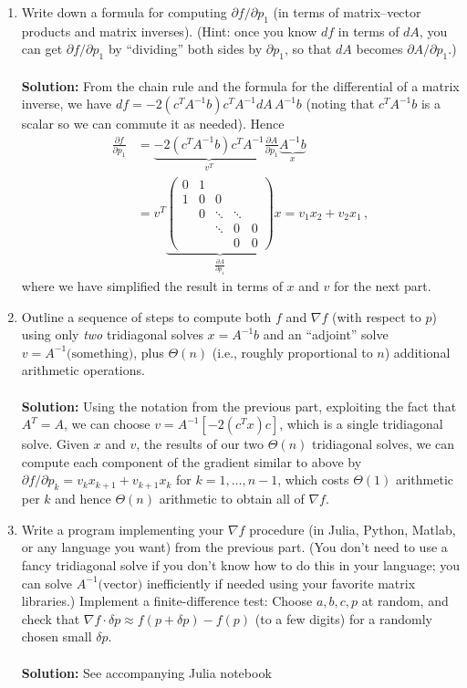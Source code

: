 \documentclass{article}
\begin{document}
\begin{enumerate}
\item Write down a formula for computing $\partial f/\partial p_{1}$ (in
terms of matrix--vector products and matrix inverses). (Hint: once
you know $df$ in terms of $dA$, you can get $\partial f/\partial p_{1}$
by ``dividing'' both sides by $\partial p_{1}$, so that $dA$ becomes
$\partial A/\partial p_{1}$.)
\\
\\
\textbf{Solution:} From the chain rule and the formula for the differential of a matrix inverse, we have $df = -2(c^T A^{-1} b) c^T A^{-1} dA\,A^{-1} b$ (noting that $c^T A^{-1} b$ is a scalar so we can commute it as needed).  Hence
\begin{align*}
\frac{\partial f}{\partial p_1} &= \underbrace{-2(c^T A^{-1} b) c^T A^{-1}}_{v^T} \frac{\partial A}{\partial p_1} \underbrace{A^{-1} b}_x \\
&=  v^T \underbrace{\left(\begin{array}{ccccc}
0 & 1\\
1 & 0 & 0\\
 & 0 & \ddots & \ddots\\
 &  & \ddots & 0 & 0\\
 &  &  & 0 & 0
\end{array}\right)}_{\frac{\partial A}{\partial p_1}} x = \boxed{v_1 x_2 + v_2 x_1} \, ,
\end{align*}
where we have simplified the result in terms of $x$ and $v$ for the next part.

\item Outline a sequence of steps to compute both $f$ and $\nabla f$ (with
respect to $p$) using only \emph{two} tridiagonal solves $x=A^{-1}b$
and an ``adjoint'' solve $v=A^{-1}\text{(something)}$, plus $\Theta(n)$
(i.e., roughly proportional to $n$) additional arithmetic operations.
\\
\\
\textbf{Solution:} Using the notation from the previous part, exploiting the fact that $A^T = A$, we can choose $\boxed{v = A^{-1} [-2(c^T x) c]}$, which is a single tridiagonal solve.  Given $x$ and $v$, the results of our two $\Theta(n)$ tridiagonal solves, we can compute each component of the gradient similar to above by $\boxed{\partial f/\partial p_k = v_k x_{k+1} + v_{k+1} x_k}$ for $k=1,\ldots,n-1$, which costs $\Theta(1)$ arithmetic per $k$ and hence $\Theta(n)$ arithmetic to obtain all of $\nabla f$.

\item Write a program implementing your $\nabla f$ procedure (in Julia,
Python, Matlab, or any language you want) from the previous part.
(You don't need to use a fancy tridiagonal solve if you don't know
how to do this in your language; you can solve $A^{-1}\text{(vector)}$
inefficiently if needed using your favorite matrix libraries.) Implement
a finite-difference test: Choose $a,b,c,p$ at random, and check that
$\nabla f\cdot\delta p\approx f(p+\delta p)-f(p)$ (to a few digits)
for a randomly chosen small $\delta p$.
\\
\\
\textbf{Solution:} See accompanying Julia notebook


\end{enumerate}
\end{document}
